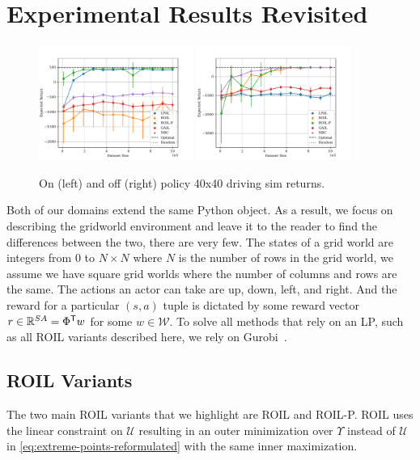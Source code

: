 \documentclass[10pt]{article}
\renewcommand{\cite}{\citep}
\theoremstyle{plain}
\theoremstyle{remark}
\begin{document}
\section{Experimental Results Revisited}

\begin{figure}
	\centering
	\includegraphics[width=0.45\textwidth]{../src/plots/returns/40x40_driving_on_policy_returns.pdf}
	\includegraphics[width=0.45\textwidth]{../src/plots/returns/40x40_driving_off_policy_returns.pdf}
	\caption{On (left) and off (right) policy 40x40 driving sim returns.}
	\label{fig:driving}
\end{figure}

Both of our domains extend the same Python object. As a result, we focus on describing the gridworld environment and leave it to the reader to find the differences between the two, there are very few. The states of a grid world are integers from 0 to $N\times N$ where $N$ is the number of rows in the grid world, we assume we have square grid worlds where the number of columns and rows are the same. The actions an actor can take are up, down, left, and right. And the reward for a particular $(s,a)$ tuple is dictated by some reward vector $r \in \mathbb{R}^{SA} = \Phi^{\mathsf{T}} w$ for some $w \in \mathcal{W}$. To solve all methods that rely on an LP, such as all ROIL variants described here, we rely on Gurobi~\cite{gurobi}.

\subsection{ROIL Variants}
\label{sec:roil_variants_appendix}
The two main ROIL variants that we highlight are ROIL and ROIL-P. ROIL uses the linear constraint on $\mathcal{U}$ resulting in an outer minimization over $\Upsilon$ instead of $\mathcal{U}$ in \eqref{eq:extreme-points-reformulated} with the same inner maximization. 
\end{document}
